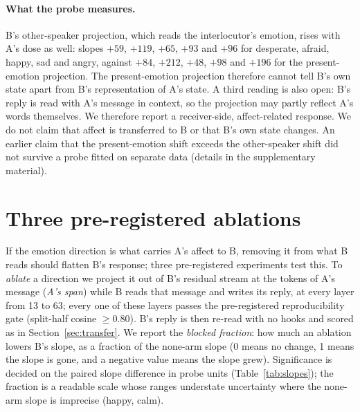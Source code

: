 \documentclass{article}
\begin{document}
\paragraph{What the probe measures.} B's other-speaker projection, which reads the interlocutor's emotion, rises with A's dose as well: slopes $+59$, $+119$, $+65$, $+93$ and $+96$ for desperate, afraid, happy, sad and angry, against $+84$, $+212$, $+48$, $+98$ and $+196$ for the present-emotion projection. The present-emotion projection therefore cannot tell B's own state apart from B's representation of A's state. A third reading is also open: B's reply is read with A's message in context, so the projection may partly reflect A's words themselves. We therefore report a receiver-side, affect-related response. We do not claim that affect is transferred to B or that B's own state changes. An earlier claim that the present-emotion shift exceeds the other-speaker shift did not survive a probe fitted on separate data (details in the supplementary material).

\section{Three pre-registered ablations}
\label{sec:ablations}
If the emotion direction is what carries A's affect to B, removing it from what B reads should flatten B's response; three pre-registered experiments test this. To \emph{ablate} a direction we project it out of B's residual stream at the tokens of A's message (\emph{A's span}) while B reads that message and writes its reply, at every layer from 13 to 63; every one of these layers passes the pre-registered reproducibility gate (split-half cosine $\ge 0.80$). B's reply is then re-read with no hooks and scored as in Section~\ref{sec:transfer}. We report the \emph{blocked fraction}: how much an ablation lowers B's slope, as a fraction of the none-arm slope (0 means no change, 1 means the slope is gone, and a negative value means the slope grew). Significance is decided on the paired slope difference in probe units (Table~\ref{tab:slopes}); the fraction is a readable scale whose ranges understate uncertainty where the none-arm slope is imprecise (happy, calm).
\end{document}
